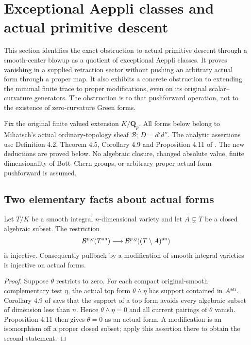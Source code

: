 \section{Exceptional Aeppli classes and actual primitive descent}
\label{r13d:section}

This section identifies the exact obstruction to actual primitive descent
through a smooth-center blowup as a quotient of exceptional Aeppli
classes.  It proves vanishing in a supplied retraction sector without
pushing an arbitrary actual form through a proper map.  It also exhibits a concrete
obstruction to extending the minimal finite trace to proper modifications,
even on its original scalar--curvature generators.  The obstruction is to
that pushforward operation, not to the existence of zero-curvature Green
forms.

Fix the original finite valued extension $K/\mathbf Q_p$.  All forms
below belong to Mihatsch's actual ordinary-topology sheaf $\mathcal B$;
$D=d'd''$.  The analytic assertions use Definition 4.2, Theorem 4.5,
Corollary 4.9 and Proposition 4.11 of \cite{M}.  The new deductions are
proved below.  No algebraic closure, changed absolute value, finite
dimensionality of Bott--Chern groups, or arbitrary proper actual-form
pushforward is assumed.

\subsection{Two elementary facts about actual forms}

\begin{lemma}
\label{r13d:dense-faithful}
Let $T/K$ be a smooth integral $n$-dimensional variety and let
$A\subsetneq T$ be a closed algebraic subset.  The restriction
\[
 \mathcal B^{p,q}(T^{\rm an})
       \longrightarrow\mathcal B^{p,q}((T\setminus A)^{\rm an})
\]
is injective.  Consequently pullback by a modification of smooth
integral varieties is injective on actual forms.
\end{lemma}

\begin{proof}
Suppose $\theta$ restricts to zero.  For each compact original-smooth
complementary test $\eta$, the actual top form $\theta\wedge\eta$ has
support contained in $A^{\rm an}$.  Corollary 4.9 of \cite{M} says that
the support of a top form avoids every algebraic subset of dimension
less than $n$.  Hence $\theta\wedge\eta=0$ and all current pairings
of $\theta$ vanish.  Proposition 4.11 then gives $\theta=0$ as an
actual form.  A modification is an isomorphism off a proper closed
subset; apply this assertion there to obtain the second statement.
\end{proof}

